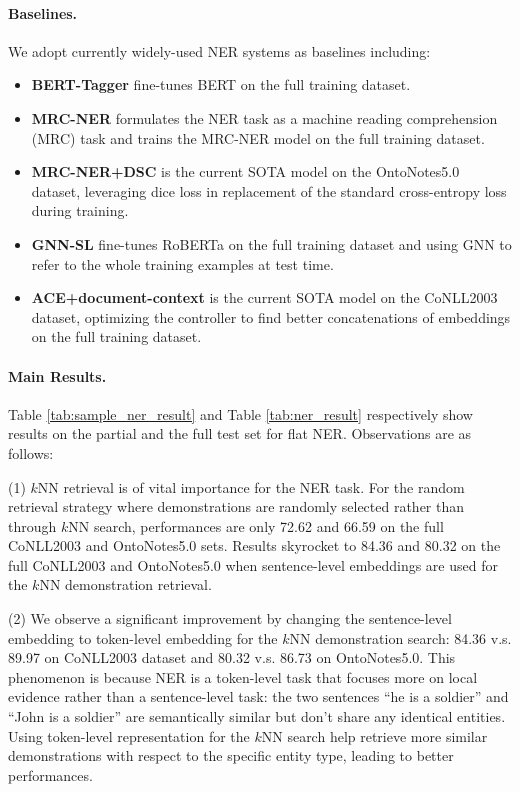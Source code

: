 \documentclass{article}
\begin{document}
\paragraph{Baselines.} We adopt currently widely-used NER systems as baselines including:
\begin{itemize}
  \item \textbf{BERT-Tagger} \cite{devlin2018bert} fine-tunes BERT on the full training dataset.
  \item \textbf{MRC-NER} \cite{li2019unified} formulates the NER task as a machine reading comprehension (MRC) task and trains the MRC-NER model on the full training dataset.
  \item \textbf{MRC-NER+DSC} \cite{li2019dice} is the current SOTA model on the OntoNotes5.0 dataset, leveraging dice loss in replacement of the standard cross-entropy loss during training.
  \item \textbf{GNN-SL} \cite{wang2022gnn} fine-tunes RoBERTa \cite{liu2019roberta} on the full training dataset and using GNN to refer to the whole training examples at test time.
  \item \textbf{ACE+document-context} \cite{wang2020automated} is the current SOTA model on the CoNLL2003 dataset, optimizing the controller to find better concatenations of embeddings on the full training dataset.
\end{itemize}


\paragraph{Main Results.}
\label{flat_ner_results}
Table \ref{tab:sample_ner_result} and Table \ref{tab:ner_result} 
respectively show results on the partial and the full test set for flat NER. Observations are as follows:

(1) $k$NN retrieval is of vital importance for the NER task.
For the random retrieval strategy where demonstrations are randomly selected rather than through $k$NN search,  performances are only 72.62 and 66.59 on the full CoNLL2003 and 
OntoNotes5.0 sets. Results skyrocket to 84.36 and 80.32 on the full CoNLL2003 and 
OntoNotes5.0 when sentence-level embeddings are used for the $k$NN demonstration retrieval. 

(2) We observe a significant improvement by changing the sentence-level embedding to token-level embedding for the $k$NN demonstration search: 84.36 v.s. 89.97 on  CoNLL2003 dataset and 80.32 v.s. 86.73 on OntoNotes5.0. This phenomenon is because NER is a token-level task that focuses more on local evidence rather than a sentence-level task: the two sentences “he is a soldier” and “John is a soldier” are semantically similar but don't share any identical entities.
Using token-level representation for the $k$NN search help retrieve more similar demonstrations with respect to the specific entity type, leading to better performances. 
\end{document}
